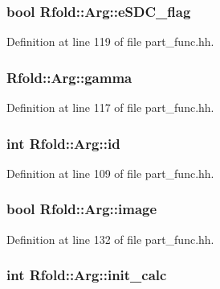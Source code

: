 \hypertarget{class_rfold_1_1_arg_addf5237deb4bf9025fa747fbd2c33366}{
\subsubsection[{e\+S\+D\+C\+\_\+flag}]{\setlength{\rightskip}{0pt plus 5cm}bool Rfold\+::\+Arg\+::e\+S\+D\+C\+\_\+flag}}\label{class_rfold_1_1_arg_addf5237deb4bf9025fa747fbd2c33366}


Definition at line 119 of file part\+\_\+func.\+hh.

\hypertarget{class_rfold_1_1_arg_a54717ae319eecf4154dba39e42094b60}{
\subsubsection[{gamma}]{ Rfold\+::\+Arg\+::gamma}}\label{class_rfold_1_1_arg_a54717ae319eecf4154dba39e42094b60}


Definition at line 117 of file part\+\_\+func.\+hh.

\hypertarget{class_rfold_1_1_arg_a49ec979ca116afb70aa7a25bff04d3a8}{
\subsubsection[{id}]{\setlength{\rightskip}{0pt plus 5cm}int Rfold\+::\+Arg\+::id}}\label{class_rfold_1_1_arg_a49ec979ca116afb70aa7a25bff04d3a8}


Definition at line 109 of file part\+\_\+func.\+hh.

\hypertarget{class_rfold_1_1_arg_ab7df3ff6900da414d534707f37d87c2d}{
\subsubsection[{image}]{\setlength{\rightskip}{0pt plus 5cm}bool Rfold\+::\+Arg\+::image}}\label{class_rfold_1_1_arg_ab7df3ff6900da414d534707f37d87c2d}


Definition at line 132 of file part\+\_\+func.\+hh.

\hypertarget{class_rfold_1_1_arg_af97e7ba185a8a01a2d6baa5a1689f077}{
\subsubsection[{init\+\_\+calc}]{\setlength{\rightskip}{0pt plus 5cm}int Rfold\+::\+Arg\+::init\+\_\+calc}}\label{class_rfold_1_1_arg_af97e7ba185a8a01a2d6baa5a1689f077}



